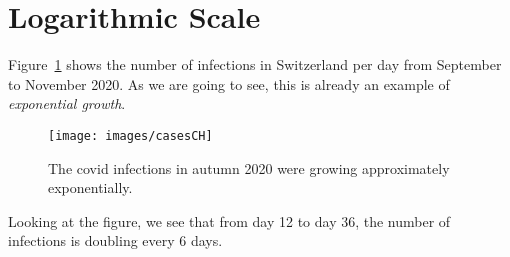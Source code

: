 \section*{Logarithmic Scale}
Figure~\ref{fig:casesCH} shows the number of infections in Switzerland per day from September to November 2020.
As we are going to see, this is already an example of \textit{exponential growth}.
\begin{figure}[ht]
	\centering
	\texttt{[image: images/casesCH]}
	\caption{The covid infections in autumn 2020 were growing approximately exponentially.}
	\label{fig:casesCH}
\end{figure}
Looking at the figure, we see that from day 12 to day 36, the number of infections is doubling every 6 days.